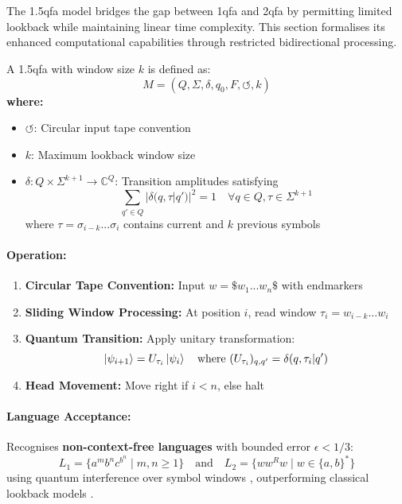 \section{}
\label{sec:1.5qfa}
The \gls{1.5qfa} model bridges the gap between \gls{1qfa} and \gls{2qfa} by permitting limited lookback while maintaining linear time complexity. This section formalises its enhanced computational capabilities through restricted bidirectional processing.

\begin{definition}
A \gls{1.5qfa} with window size $k$ is defined as:
\[
M = (Q, \Sigma, \delta, q_0, F, \circlearrowleft, k)
\]
\textbf{where:}
\begin{itemize}
    \item $\circlearrowleft$: Circular input tape convention
    \item $k$: Maximum lookback window size
    \item $\delta: Q \times \Sigma^{k+1} \rightarrow \mathbb{C}^Q$: Transition amplitudes satisfying
    \[
    \sum_{q'\in Q} |\delta(q,\tau|q')|^2 = 1 \quad \forall q \in Q, \tau \in \Sigma^{k+1}
    \]
    where $\tau = \sigma_{i-k}...\sigma_i$ contains current and $k$ previous symbols
\end{itemize}
\end{definition}

\paragraph{Operation:}
\begin{enumerate}
    \item \textbf{Circular Tape Convention:} Input $w = \$w_1...w_n\$$ with endmarkers
    \item \textbf{Sliding Window Processing:} At position $i$, read window $\tau_i = w_{i-k}...w_i$
    \item \textbf{Quantum Transition:} Apply unitary transformation:
    \[
    \ket{\psi_{i+1}} = U_{\tau_i} \ket{\psi_i} \quad \text{where } (U_{\tau_i})_{q,q'} = \delta(q,\tau_i|q')
    \]
    \item \textbf{Head Movement:} Move right if $i < n$, else halt
\end{enumerate}

\paragraph{Language Acceptance:}
Recognises \textbf{non-context-free languages} with bounded error $\epsilon < 1/3$:
\[
L_1 = \{a^mb^nc^{b^n} \mid m,n \geq 1\} \quad \text{and} \quad L_2 = \{ww^Rw \mid w \in \{a,b\}^*\} 
\]
using quantum interference over symbol windows \cite{ambainis1998}, outperforming classical lookback models \cite{moore1971}.

